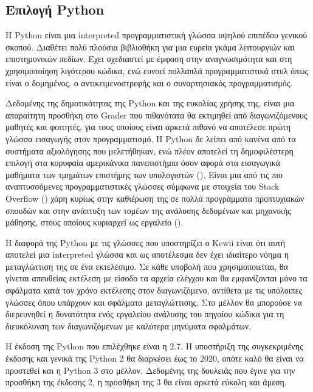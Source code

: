 \documentclass[diploma]{softlab-thesis}
\begin{document}
\subsection{Επιλογή Python}

Η Python είναι μια interpreted προγραμματιστική γλώσσα υψηλού επιπέδου γενικού
σκοπού. Διαθέτει πολύ πλούσια βιβλιοθήκη για μια ευρεία γκάμα λειτουργιών και
επιστημονικών πεδίων. Έχει σχεδιαστεί με έμφαση στην αναγνωσιμότητα και στη
χρησιμοποίηση λιγότερου κώδικα, ενώ ευνοεί πολλαπλά προγραμματιστικά στυλ όπως
είναι ο δομημένος, ο αντικειμενοστρεφής και ο συναρτησιακός προγραμματισμός.

\bigskip

Δεδομένης της δημοτικότητας της Python και της ευκολίας χρήσης της, είναι μια
απαραίτητη προσθήκη στο Grader που πιθανότατα θα εκτιμηθεί από διαγωνιζόμενους
μαθητές και φοιτητές, για τους οποίους είναι αρκετά πιθανό να αποτέλεσε πρώτη
γλώσσα εισαγωγής στον προγραμματισμό. Η Python δε λείπει από κανένα από τα
συστήματα αξιολόγησης που μελετήθηκαν, ενώ πλέον αποτελεί τη δημοφιλέστερη
επιλογή στα κορυφαία αμερικάνικα πανεπιστήμια όσον αφορά στα εισαγωγικά
μαθήματα των τμημάτων επιστήμης των υπολογιστών (\cite{popularpython}).
Είναι μια από τις πιο αναπτυσσόμενες προγραμματιστικές γλώσσες σύμφωνα με
στοιχεία του Stack Overflow (\cite{pythongrowth}) χάρη κυρίως στην
καθιέρωση της σε πολλά προγράμματα προπτυχιακών σπουδών και στην ανάπτυξη των
τομέων της ανάλυσης δεδομένων και μηχανικής μάθησης, στους οποίους κυριαρχεί ως
εργαλείο (\cite{whypython}).

\bigskip

Η διαφορά της Python με τις γλώσσες που υποστηρίζει ο Kewii είναι ότι αυτή
αποτελεί μια interpreted γλώσσα και ως αποτέλεσμα δεν έχει ιδιαίτερο νόημα η
μεταγλώττιση της σε ένα εκτελέσιμο. Σε κάθε υποβολή που χρησιμοποιείται, θα
γίνεται απευθείας εκτέλεση με είσοδο τα αρχεία ελέγχου και θα εμφανίζονται μόνο
τα σφάλματα κατά τον χρόνο εκτέλεσης στον διαγωνιζόμενο, αντίθετα με τις
υπόλοιπες γλώσσες όπου υπάρχουν και σφάλματα μεταγλώττισης. Στο μέλλον θα
μπορούσε να διερευνηθεί η δυνατότητα ενός εργαλείου ανάλυσης του πηγαίου κώδικα
για τη διευκόλυνση των διαγωνιζόμενων με καλύτερα μηνύματα σφαλμάτων.

\bigskip

Η έκδοση της Python που επιλέχθηκε είναι η 2.7. Η υποστήριξη της συγκεκριμένης
έκδοσης και γενικά της Python 2 θα διαρκέσει έως το 2020, οπότε καλό θα είναι
να προστεθεί και η Python 3 στο μέλλον. Δεδομένης της δουλειάς που έγινε για
την προσθήκη της έκδοσης 2, η προσθήκη της 3 θα είναι αρκετά εύκολη και άμεση.
\end{document}
